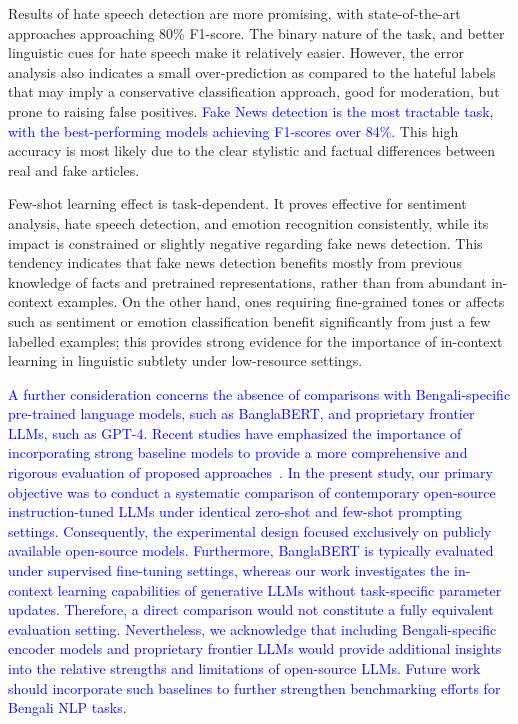 \documentclass[10pt,letterpaper]{article}
\newcommand{\rev}[1]{\textcolor{blue}{#1}}
\begin{document}
Results of hate speech detection are more promising, with state-of-the-art approaches approaching 80\% F1-score. The binary nature of the task, and better linguistic cues for hate speech make it relatively easier. However, the error analysis also indicates a small over-prediction as compared to the hateful labels that may imply a conservative classification approach, good for moderation, but prone to raising false positives. \rev{Fake News detection is the most tractable task, with the best-performing models achieving F1-scores over 84\%.} This high accuracy is most likely due to the clear stylistic and factual differences between real and fake articles.

Few-shot learning effect is task-dependent. It proves effective for sentiment analysis, hate speech detection, and emotion recognition consistently, while its impact is constrained or slightly negative regarding fake news detection. This tendency indicates that fake news detection benefits mostly from previous knowledge of facts and pretrained representations, rather than from abundant in-context examples. On the other hand, ones requiring fine-grained tones or affects such as sentiment or emotion classification benefit significantly from just a few labelled examples; this provides strong evidence for the importance of in-context learning in linguistic subtlety under low-resource settings.

\rev{A further consideration concerns the absence of comparisons with Bengali-specific pre-trained language models, such as BanglaBERT, and proprietary frontier LLMs, such as GPT-4. Recent studies have emphasized the importance of incorporating strong baseline models to provide a more comprehensive and rigorous evaluation of proposed approaches~\cite{b49,b50,b51,b52,b53}. In the present study, our primary objective was to conduct a systematic comparison of contemporary open-source instruction-tuned LLMs under identical zero-shot and few-shot prompting settings. Consequently, the experimental design focused exclusively on publicly available open-source models. Furthermore, BanglaBERT is typically evaluated under supervised fine-tuning settings, whereas our work investigates the in-context learning capabilities of generative LLMs without task-specific parameter updates. Therefore, a direct comparison would not constitute a fully equivalent evaluation setting. Nevertheless, we acknowledge that including Bengali-specific encoder models and proprietary frontier LLMs would provide additional insights into the relative strengths and limitations of open-source LLMs. Future work should incorporate such baselines to further strengthen benchmarking efforts for Bengali NLP tasks.}
\end{document}

